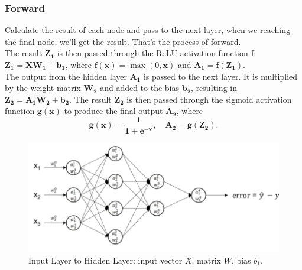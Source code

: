 \documentclass[aspectratio=1610]{beamer}
\begin{document}
\begin{frame}
    \frametitle{Forward}
    Calculate the result of each node and pass to the next layer, when we reaching the final node, we’ll get the result. That’s the process of forward.
    \\The result $\boldsymbol{Z_1}$ is then passed through the ReLU activation function $\boldsymbol{f}$: 
    $\boldsymbol{Z_1} = \boldsymbol{X} \boldsymbol{W_1} + \boldsymbol{b_1}$, where 
    $\boldsymbol{f(x)} = \max(0, \boldsymbol{x})$ and $\boldsymbol{A_1} = \boldsymbol{f(Z_1)}$.
    \\The output from the hidden layer $\boldsymbol{A_1}$ is passed to the next layer. It is multiplied by the weight matrix $\boldsymbol{W_2}$ and added to the bias $\boldsymbol{b_2}$, resulting in $\boldsymbol{Z_2} = \boldsymbol{A_1}\boldsymbol{W_2} + \boldsymbol{b_2}$. The result $\boldsymbol{Z_2}$ is then passed through the sigmoid activation function $\boldsymbol{g(x)}$ to produce the final output $\boldsymbol{A_2}$, where 
    \[
    \boldsymbol{g(x)} = \frac{\boldsymbol{1}}{\boldsymbol{1} + \boldsymbol{e}^{-\boldsymbol{x}}}, \quad \boldsymbol{A_2} = \boldsymbol{g(Z_2)}.
    \]

    
    \begin{figure}
        \centering
        \begin{minipage}{0.6\textwidth}
            \centering
            \includegraphics[width=\linewidth]{Forward.png}
        \end{minipage}%
        \hfill
        \begin{minipage}{0.35\textwidth}
            \centering
            \caption{Input Layer to Hidden Layer: input vector $X$, matrix $W$, bias $b_1$.}
            \label{fig:enter-label}
        \end{minipage}
    \end{figure}
\end{frame}
\end{document}
